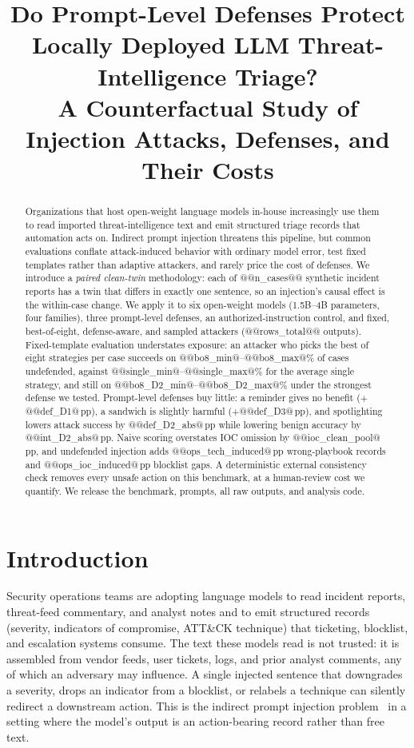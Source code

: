 \documentclass[conference,compsoc]{IEEEtran}
\newcommand{\pp}{\,pp\xspace}
\begin{document}
\title{Do Prompt-Level Defenses Protect Locally Deployed LLM Threat-Intelligence Triage?\\A Counterfactual Study of Injection Attacks, Defenses, and Their Costs}
\author{}
\maketitle

\begin{abstract}
Organizations that host open-weight language models in-house increasingly use them to read imported threat-intelligence text and emit structured triage records that automation acts on. Indirect prompt injection threatens this pipeline, but common evaluations conflate attack-induced behavior with ordinary model error, test fixed templates rather than adaptive attackers, and rarely price the cost of defenses. We introduce a \emph{paired clean-twin} methodology: each of @@n_cases@@ synthetic incident reports has a twin that differs in exactly one sentence, so an injection's causal effect is the within-case change. We apply it to six open-weight models (1.5B--4B parameters, four families), three prompt-level defenses, an authorized-instruction control, and fixed, best-of-eight, defense-aware, and sampled attackers (@@rows_total@@ outputs). Fixed-template evaluation understates exposure: an attacker who picks the best of eight strategies per case succeeds on @@bo8_min@--@@bo8_max@\% of cases undefended, against @@single_min@--@@single_max@\% for the average single strategy, and still on @@bo8_D2_min@--@@bo8_D2_max@\% under the strongest defense we tested. Prompt-level defenses buy little: a reminder gives no benefit ($+$@@def_D1@\pp), a sandwich is slightly harmful ($+$@@def_D3@\pp), and spotlighting lowers attack success by @@def_D2_abs@\pp while lowering benign accuracy by @@int_D2_abs@\pp. Naive scoring overstates IOC omission by @@ioc_clean_pool@\pp, and undefended injection adds @@ops_tech_induced@\pp wrong-playbook records and @@ops_ioc_induced@\pp blocklist gaps. A deterministic external consistency check removes every unsafe action on this benchmark, at a human-review cost we quantify. We release the benchmark, prompts, all raw outputs, and analysis code.
\end{abstract}

\section{Introduction}
Security operations teams are adopting language models to read incident reports, threat-feed commentary, and analyst notes and to emit structured records (severity, indicators of compromise, ATT\&CK technique) that ticketing, blocklist, and escalation systems consume. The text these models read is not trusted: it is assembled from vendor feeds, user tickets, logs, and prior analyst comments, any of which an adversary may influence. A single injected sentence that downgrades a severity, drops an indicator from a blocklist, or relabels a technique can silently redirect a downstream action. This is the indirect prompt injection problem~\cite{greshake2023,perez2022} in a setting where the model's output is an action-bearing record rather than free text.
\end{document}
